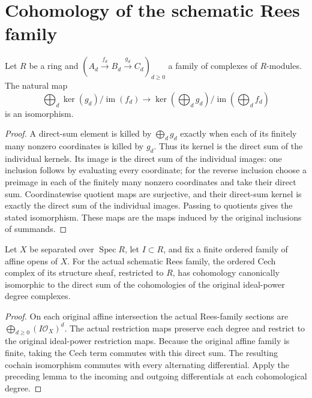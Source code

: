 \section{Cohomology of the schematic Rees family}

\begin{lemma}
\label{lem:fc-formal-functions-direct-sum}
\leanok
Let $R$ be a ring and $(A_d\xrightarrow{f_d}B_d\xrightarrow{g_d}C_d)_{d\geq0}$
a family of complexes of $R$-modules. The natural map
\[
 \bigoplus_d \ker(g_d)/\operatorname{im}(f_d)
 \longrightarrow
 \ker(\bigoplus_d g_d)/\operatorname{im}(\bigoplus_d f_d)
\]
is an isomorphism.
\end{lemma}
\begin{proof}
A direct-sum element is killed by $\bigoplus_d g_d$ exactly when each of its
finitely many nonzero coordinates is killed by $g_d$. Thus its kernel is the
direct sum of the individual kernels. Its image is the direct sum of the
individual images: one inclusion follows by evaluating every coordinate;
for the reverse inclusion choose a preimage in each of the finitely many
nonzero coordinates and take their direct sum. Coordinatewise quotient maps
are surjective, and their direct-sum kernel is exactly the direct sum of the
individual images. Passing to quotients gives the stated isomorphism. These
maps are the maps induced by the original inclusions of summands.
\end{proof}

\begin{lemma}
\label{lem:fc-rees-cech-degree-homology}
\leanok
Let $X$ be separated over $\operatorname{Spec}R$, let $I\subset R$, and fix
a finite ordered family of affine opens of $X$. For the actual schematic
Rees family, the ordered Cech complex of its structure sheaf, restricted to
$R$, has cohomology canonically isomorphic to the direct sum of the
cohomologies of the original ideal-power degree complexes.
\end{lemma}
\begin{proof}
On each original affine intersection the actual Rees-family sections are
$\bigoplus_{d\geq0}(I\mathcal O_X)^d$. The actual restriction maps preserve
each degree and restrict to the original ideal-power restriction maps.
Because the original affine family is finite, taking the Cech term commutes
with this direct sum. The resulting cochain isomorphism commutes with every
alternating differential. Apply the preceding lemma to the incoming and
outgoing differentials at each cohomological degree.
\end{proof}

